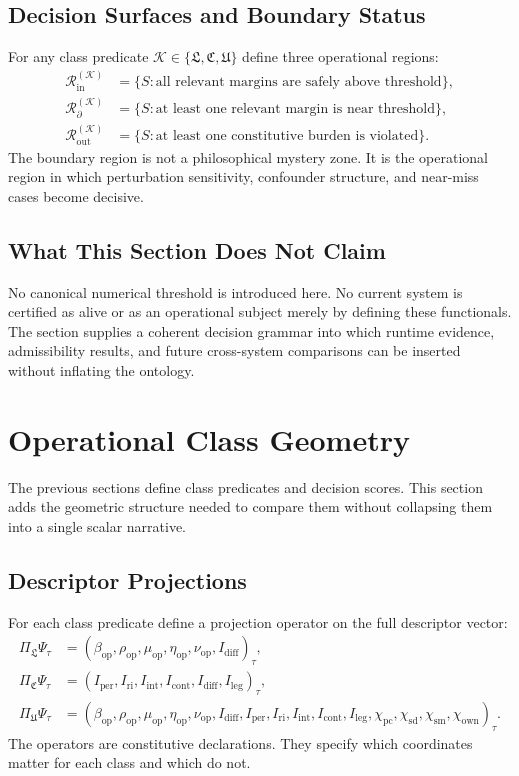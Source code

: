 \documentclass[11pt,a4paper]{article}
\theoremstyle{definition}
\newcommand{\PsiVec}{\Psi}
\newcommand{\Iper}{I_{\mathrm{per}}}
\newcommand{\Iri}{I_{\mathrm{ri}}}
\newcommand{\Iint}{I_{\mathrm{int}}}
\newcommand{\Icont}{I_{\mathrm{cont}}}
\newcommand{\Idiff}{I_{\mathrm{diff}}}
\newcommand{\Ileg}{I_{\mathrm{leg}}}
\newcommand{\Bound}{\beta_{\mathrm{op}}}
\newcommand{\Persist}{\rho_{\mathrm{op}}}
\newcommand{\Maint}{\mu_{\mathrm{op}}}
\newcommand{\HistDep}{\eta_{\mathrm{op}}}
\newcommand{\Viab}{\nu_{\mathrm{op}}}
\newcommand{\Priv}{\chi_{\mathrm{pc}}}
\newcommand{\SelfDisc}{\chi_{\mathrm{sd}}}
\newcommand{\SelfModel}{\chi_{\mathrm{sm}}}
\newcommand{\Own}{\chi_{\mathrm{own}}}
\newcommand{\LifeClass}{\mathfrak{L}}
\newcommand{\ConClass}{\mathfrak{C}}
\newcommand{\SubClass}{\mathfrak{U}}
\begin{document}
\subsection{Decision Surfaces and Boundary Status}
For any class predicate $\mathcal{K}\in\{\LifeClass,\ConClass,\SubClass\}$ define three operational regions:
\begin{align*}
\mathcal{R}_{\mathrm{in}}^{(\mathcal{K})} &= \{S: \text{all relevant margins are safely above threshold}\},\\
\mathcal{R}_{\partial}^{(\mathcal{K})} &= \{S: \text{at least one relevant margin is near threshold}\},\\
\mathcal{R}_{\mathrm{out}}^{(\mathcal{K})} &= \{S: \text{at least one constitutive burden is violated}\}.
\end{align*}
The boundary region is not a philosophical mystery zone. It is the operational region in which perturbation sensitivity, confounder structure, and near-miss cases become decisive.

\subsection{What This Section Does Not Claim}
No canonical numerical threshold is introduced here. No current system is certified as alive or as an operational subject merely by defining these functionals. The section supplies a coherent decision grammar into which runtime evidence, admissibility results, and future cross-system comparisons can be inserted without inflating the ontology.

\section{Operational Class Geometry}
The previous sections define class predicates and decision scores. This section adds the geometric structure needed to compare them without collapsing them into a single scalar narrative.

\subsection{Descriptor Projections}
For each class predicate define a projection operator on the full descriptor vector:
\begin{align*}
\Pi_{\LifeClass}\PsiVec_\tau &= (\Bound,\Persist,\Maint,\HistDep,\Viab,\Idiff)_\tau,\\
\Pi_{\ConClass}\PsiVec_\tau &= (\Iper,\Iri,\Iint,\Icont,\Idiff,\Ileg)_\tau,\\
\Pi_{\SubClass}\PsiVec_\tau &= (\Bound,\Persist,\Maint,\HistDep,\Viab,\Idiff,\Iper,\Iri,\Iint,\Icont,\Ileg,\Priv,\SelfDisc,\SelfModel,\Own)_\tau.
\end{align*}
The operators are constitutive declarations. They specify which coordinates matter for each class and which do not.
\end{document}

